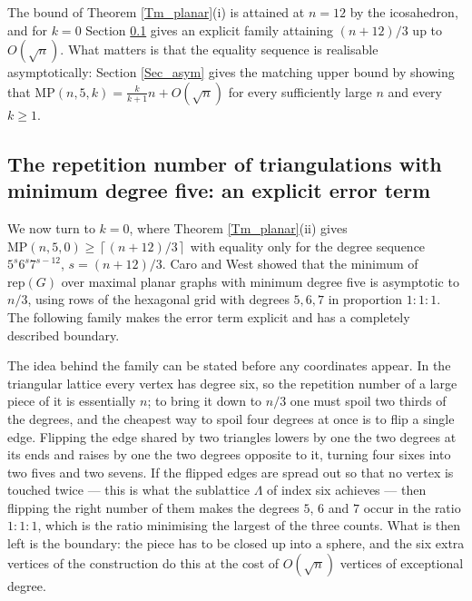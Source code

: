 \documentclass[10pt,a4paper]{article}
\begin{document}


The bound of Theorem \ref{Tm_planar}(i) is attained at $n=12$ by the icosahedron, and for $k=0$ Section
\ref{Sec_hex} gives an explicit family attaining $(n+12)/3$ up to $O(\sqrt{n})$. What matters is that the
equality sequence is realisable asymptotically: Section \ref{Sec_asym} gives the matching upper bound by
showing that $\mathrm{MP}(n,5,k)=\frac{k}{k+1}n+O(\sqrt{n})$ for every sufficiently large $n$ and every
$k\geq 1$.

\subsection{The repetition number of triangulations with minimum degree five: an explicit error
term}
\label{Sec_hex}

We now turn to $k=0$, where Theorem \ref{Tm_planar}(ii) gives
$\mathrm{MP}(n,5,0)\geq \left\lceil (n+12)/3\right\rceil $ with equality only for the degree sequence
$5^{s}6^{s}7^{s-12}$, $s=(n+12)/3$. Caro and West \cite[Theorem 2.5]{CaroWest} showed that the minimum
of $\mathrm{rep}(G)$ over maximal planar graphs with minimum degree five is asymptotic to $n/3$, using rows
of the hexagonal grid with degrees $5,6,7$ in proportion $1:1:1$. The following family makes the
error term explicit and has a completely described boundary.

The idea behind the family can be stated before any coordinates appear. In the
triangular lattice every vertex has degree six, so the repetition number of a
large piece of it is essentially $n$; to bring it down to $n/3$ one must spoil
two thirds of the degrees, and the cheapest way to spoil four degrees at once is
to flip a single edge. Flipping the edge shared by two triangles lowers by one
the two degrees at its ends and raises by one the two degrees opposite to it,
turning four sixes into two fives and two sevens. If the flipped edges are
spread out so that no vertex is touched twice --- this is what the sublattice
$\Lambda $ of index six achieves --- then flipping the right number of them
makes the degrees $5$, $6$ and $7$ occur in the ratio $1:1:1$, which is the
ratio minimising the largest of the three counts. What is then left is the
boundary: the piece has to be closed up into a sphere, and the six extra
vertices of the construction do this at the cost of $O(\sqrt{n})$ vertices of
exceptional degree.
\end{document}
